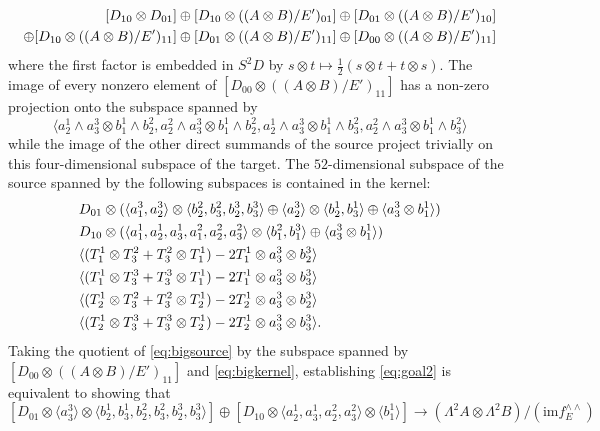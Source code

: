 \documentclass[12pt]{amsart}
\theoremstyle{definition}
\theoremstyle{remark}
\theoremstyle{definition}
\begin{document}
\begin{align}\label{eq:bigsource}
[D_{10}\otimes D_{01}] \oplus [D_{10}\otimes ((A\otimes B)/E')_{01}] \oplus [D_{01}\otimes  ((A\otimes B)/E')_{10}] \notag\\
\oplus [D_{10}\otimes ((A\otimes B)/E')_{11}] \oplus [D_{01}\otimes  ((A\otimes B)/E')_{11}] \oplus [D_{00}\otimes  ((A\otimes B)/E')_{11}] 
\end{align}
%
where the first factor is embedded in $S^2 D$ by $s\otimes t \mapsto \frac{1}{2} (s\otimes t + t\otimes s)$. The image of every nonzero element of $[D_{00}\otimes  ((A\otimes B)/E')_{11}]$ has a non-zero projection onto the subspace spanned by 
\[
\langle a^1_2\wedge a^3_3\otimes b^1_1\wedge b^2_2, a^2_2\wedge a^3_3\otimes b^1_1\wedge b^2_2, a^1_2\wedge a^3_3\otimes b^1_1\wedge b^2_3, a^2_2\wedge a^3_3\otimes b^1_1\wedge b^2_3\rangle
\]
while the image of the other direct summands of the source project trivially on this four-dimensional subspace of the target. The $52$-dimensional subspace of the source spanned by the following subspaces is contained in the kernel:
\begin{align}\label{eq:bigkernel}
&D_{01} \otimes (\langle a^3_1, a^3_2\rangle \otimes \langle b^2_2,  b^2_3, b^3_2, b^3_3\rangle \oplus \langle a^3_2\rangle \otimes \langle b^1_2, b^1_3\rangle \oplus \langle a^3_3\otimes b^1_1\rangle)\notag\\
&D_{10} \otimes (\langle a^1_1,a^1_2,a^1_3,a^2_1,a^2_2,a^2_3\rangle \otimes \langle b^2_1, b^3_1\rangle\oplus \langle a^3_3\otimes b^1_1\rangle)\notag\\
&\langle (T^1_1 \otimes T^2_3 + T^2_3 \otimes T^1_1) -2 T^1_1 \otimes a^3_3 \otimes b^3_2\rangle\\
&\langle (T^1_1 \otimes T^3_3 + T^3_3 \otimes T^1_1) -2 T^1_1 \otimes a^3_3 \otimes b^3_3\rangle\notag\\
&\langle (T^1_2 \otimes T^2_3 + T^2_3 \otimes T^1_2) -2 T^1_2 \otimes a^3_3 \otimes b^3_2\rangle \notag\\
&\langle (T^1_2 \otimes T^3_3 + T^3_3 \otimes T^1_2) -2 T^1_2 \otimes a^3_3 \otimes b^3_3\rangle.\notag
\end{align}
%
Taking the quotient of \eqref{eq:bigsource} by the subspace spanned by $[D_{00}\otimes  ((A\otimes B)/E')_{11}]$ and \eqref{eq:bigkernel}, establishing \eqref{eq:goal2} is equivalent to showing that
\[
[D_{01}\otimes \langle a^3_3\rangle \otimes \langle b^1_2,b^1_3,b^2_2, b^2_3, b^3_2, b^3_3\rangle ]  \oplus [D_{10}\otimes \langle a^1_2, a^1_3, a^2_2,a^2_3\rangle \otimes \langle b^1_1\rangle] \to (\Lambda^2 A \otimes \Lambda^2 B)/(\mathrm{im} f^{\wedge\wedge}_E)
\]
\end{document}
